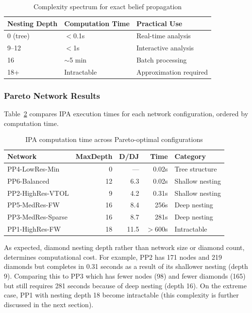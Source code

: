 \begin{table}[ht]
\caption{Complexity spectrum for exact belief propagation}
\label{tab:complexity_spectrum}
\centering
\begin{tabular}{lll}
\toprule
\textbf{Nesting Depth} & \textbf{Computation Time} & \textbf{Practical Use} \\
\midrule
0 (tree)   & $<$0.1s   & Real-time analysis \\
9--12      & $<$1s     & Interactive analysis \\
16         & $\sim$5 min & Batch processing \\
18+        & Intractable & Approximation required \\
\bottomrule
\end{tabular}
\end{table}


\subsubsection{Pareto Network Results}

Table~\ref{tab:pareto_timing} compares IPA execution times for each network configuration, ordered by computation time.

\begin{table}[ht]
\caption{IPA computation time across Pareto-optimal configurations}
\label{tab:pareto_timing}
\centering
\begin{tabular}{lrrrl}
\toprule
\textbf{Network} & \textbf{MaxDepth} & \textbf{D/DJ} & \textbf{Time} & \textbf{Category} \\
\midrule
PP4-LowRes-Min    &  0 & --- &    0.02s & Tree structure \\
PP6-Balanced      & 12 & 6.3 &    0.02s & Shallow nesting \\
PP2-HighRes-VTOL  &  9 & 4.2 &    0.31s & Shallow nesting \\
PP5-MedRes-FW     & 16 & 8.4 &     256s & Deep nesting \\
PP3-MedRes-Sparse & 16 & 8.7 &     281s & Deep nesting \\
PP1-HighRes-FW    & 18 & 11.5 &  $>$600s & Intractable \\
\bottomrule
\end{tabular}
\end{table}

As expected, diamond nesting depth rather than network size or diamond count, determines computational cost. For example, PP2 has 171 nodes and 219 diamonds but completes in 0.31 seconds as a result of its  shallower nesting (depth 9). Comparing this to PP3 which  has fewer nodes (98) and fewer diamonds (165) but still requires 281 seconds because of deep nesting (depth 16). On the extreme case, PP1 with nesting depth 18 become intractable (this complexity is further discussed in the next section). 

